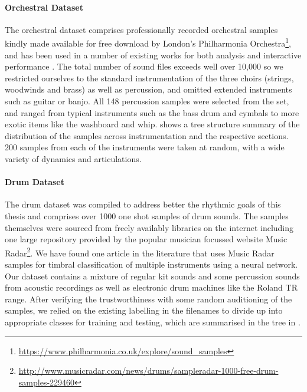 {{{{\paragraph{Orchestral Dataset}
\label{sec:orch_dataset}

The orchestral dataset comprises professionally recorded orchestral samples kindly made available for free download by London's Philharmonia Orchestra\footnote{\url{https://www.philharmonia.co.uk/explore/sound_samples}}, and has been used in a number of existing works for both analysis \citep{Hulshof2016, Donnelly2016, Pishdadian2017} and interactive performance \citep{Miller2010}. The total number of sound files exceeds well over 10,000 so we restricted ourselves to the standard instrumentation of the three choirs (strings, woodwinds and brass) as well as percussion, and omitted extended instruments such as guitar or banjo. All 148 percussion samples were selected from the set, and ranged from typical instruments such as the bass drum and cymbals to more exotic items like the washboard and whip.  shows a tree structure summary of the distribution of the samples across instrumentation and the respective sections. 200 samples from each of the instruments were taken at random, with a wide variety of dynamics and articulations.

\paragraph{Drum Dataset}
\label{sec:drum_dataset}

The drum dataset was compiled to address better the rhythmic goals of this thesis and comprises over 1000 one shot samples of drum sounds. The samples themselves were sourced from freely availably libraries on the internet including one large repository provided by the popular musician focussed website Music Radar\footnote{\url{http://www.musicradar.com/news/drums/sampleradar-1000-free-drum-samples-229460}}. We have found one article in the literature \citep{Masood2015} that uses Music Radar samples for timbral classification of multiple instruments using a neural network. Our dataset contains a mixture of regular kit sounds and some percussion sounds from acoustic recordings as well as electronic drum machines like the Roland TR range. After verifying the trustworthiness with some random auditioning of the samples, we relied on the existing labelling in the filenames to divide up into appropriate classes for training and testing, which are summarised in the tree in .


}}}}
